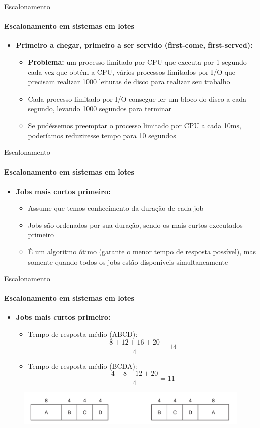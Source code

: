 \documentclass{beamer}
\begin{document}
\begin{frame}{Escalonamento}
	\framesubtitle{Escalonamento em sistemas em lotes}
	\begin{itemize}
		\item \textbf{Primeiro a chegar, primeiro a ser servido (first-come, first-served):}
		\begin{itemize}
			\item \textbf{Problema:} um processo limitado por CPU que executa por 1 segundo cada vez que obtém a CPU, vários processos limitados por I/O que precisam realizar 1000 leituras de disco para realizar seu trabalho
			\item Cada processo limitado por I/O consegue ler um bloco do disco a cada segundo, levando 1000 segundos para terminar
			\item Se pudéssemos preemptar o processo limitado por CPU a cada 10ms, poderíamos reduziresse tempo para 10 segundos
		\end{itemize}
	\end{itemize}
\end{frame}
\begin{frame}{Escalonamento}
	\framesubtitle{Escalonamento em sistemas em lotes}
	\begin{itemize}
		\item \textbf{Jobs mais curtos primeiro:}
		\begin{itemize}
			\item Assume que temos conhecimento da duração de cada job
			\item Jobs são ordenados por sua duração, sendo os mais curtos executados primeiro
			\item É um algoritmo ótimo (garante o menor tempo de resposta possível), mas somente quando todos os jobs estão disponíveis simultaneamente
		\end{itemize}
	\end{itemize}
\end{frame}
\begin{frame}{Escalonamento}
	\framesubtitle{Escalonamento em sistemas em lotes}
	\begin{itemize}
		\item \textbf{Jobs mais curtos primeiro:}
		\begin{itemize}
			\item Tempo de resposta médio (ABCD):
			\begin{equation*}
				\frac{8 + 12 + 16 + 20}{4} = 14
			\end{equation*}
			\item Tempo de resposta médio (BCDA):
			\begin{equation*}
				 \frac{4 + 8 + 12 + 20}{4} = 11
			\end{equation*}
		\end{itemize}
	\end{itemize}
	\begin{figure}
		\includegraphics[width=0.8\paperwidth]{resources/shortestjob}
	\end{figure}
\end{frame}
\end{document}
